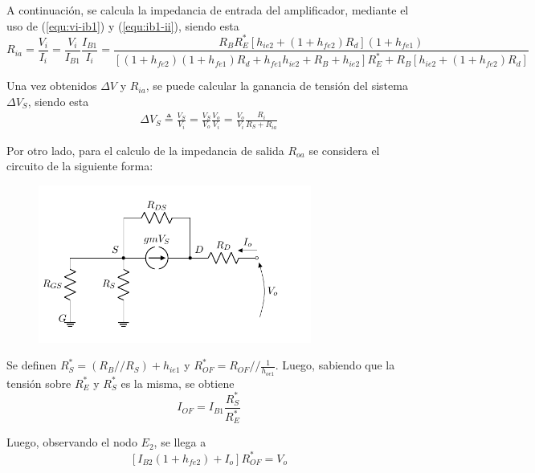 A continuación, se calcula la impedancia de entrada del amplificador, mediante el uso de (\ref{equ:vi-ib1}) y (\ref{equ:ib1-ii}), siendo esta
\begin{equation}
	R_{ia} = \frac{V_i}{I_i} =  \frac{V_i}{I_{B1}}\frac{I_{B1}}{I_i} = \frac{ R_B R_{E}^* \left[ h_{ie2} + \left( 1 + h_{fe2} \right) R_d \right] \left( 1 + h_{fe1} \right) }{ \left[ \left( 1 + h_{fe2} \right)  \left( 1 + h_{fe1} \right) R_d + h_{fe1} h_{ie2} + R_B + h_{ie2} \right] R_{E}^* + R_B \left[ h_{ie2} + \left( 1 + h_{fe2} \right) R_d \right] }
	\label{equ:Ria}
\end{equation}

Una vez obtenidos $\Delta V$ y $R_{ia}$, se puede calcular la ganancia de tensión del sistema $\Delta V_S$, siendo esta
\begin{equation}
\begin{split}
	\Delta V_S \triangleq \frac{V_S}{V_i} = \frac{V_S}{V_o} \frac{V_o}{V_i} = \frac{V_o}{V_i} \frac{R_i}{R_S + R_{ia}}
\end{split}
\label{equ:Avs}
\end{equation}

Por otro lado, para el calculo de la impedancia de salida $R_{oa}$ se considera el circuito de la siguiente forma:
\begin{figure}[H]
\centering
	\includegraphics[width=0.8\textwidth, page=7]{Imagenes/ModeloIncremental.pdf}
\end{figure}
Se definen $R_{S}^* = \left( R_B // R_S \right) + h_{ie1}$ y $R_{OF}^* = R_{OF} // \frac{1}{h_{oe1}}$. Luego, sabiendo que la tensión sobre $R_{E}^*$ y $R_{S}^*$ es la misma, se obtiene
\begin{equation}
	I_{OF} = I_{B1} \frac{R_{S}^*}{R_{E}^*}
	\label{equ:roa1}
\end{equation}

Luego, observando el nodo $E_2$, se llega a
\begin{equation}
	\left[ I_{B2} \left( 1 + h_{fe2} \right) + I_o \right] R_{OF}^* = V_o
	\label{equ:roa2}
\end{equation}

